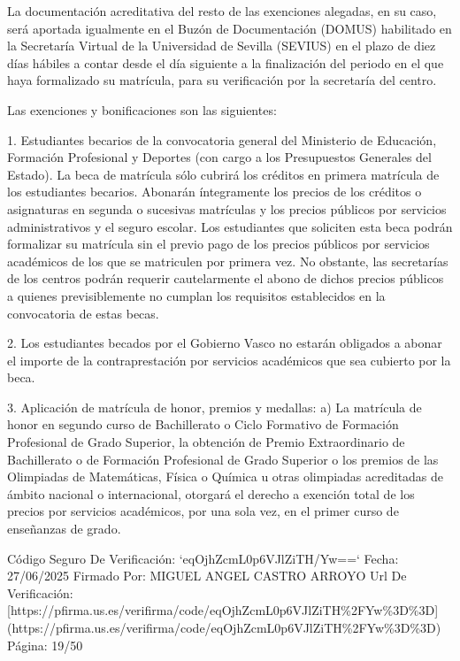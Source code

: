\documentclass{article}
\begin{document}
\begin{itemize}
\begin{itemize}
\begin{scriptsize}
                  La documentación acreditativa del resto de las exenciones alegadas, en su caso, será aportada igualmente en el Buzón de Documentación (DOMUS) habilitado en la Secretaría Virtual de la Universidad de Sevilla (SEVIUS) en el plazo de diez días hábiles a contar desde el día siguiente a la finalización del periodo en el que haya formalizado su matrícula, para su verificación por la secretaría del centro.

                  Las exenciones y bonificaciones son las siguientes:

                  1. Estudiantes becarios de la convocatoria general del Ministerio de Educación, Formación Profesional y Deportes (con cargo a los Presupuestos Generales del Estado). La beca de matrícula sólo cubrirá los créditos en primera matrícula de los estudiantes becarios. Abonarán íntegramente los precios de los créditos o asignaturas en segunda o sucesivas matrículas y los precios públicos por servicios administrativos y el seguro escolar. Los estudiantes que soliciten esta beca podrán formalizar su matrícula sin el previo pago de los precios públicos por servicios académicos de los que se matriculen por primera vez. No obstante, las secretarías de los centros podrán requerir cautelarmente el abono de dichos precios públicos a quienes previsiblemente no cumplan los requisitos establecidos en la convocatoria de estas becas.

                  2. Los estudiantes becados por el Gobierno Vasco no estarán obligados a abonar el importe de la contraprestación por servicios académicos que sea cubierto por la beca.

                  3. Aplicación de matrícula de honor, premios y medallas:
                  a) La matrícula de honor en segundo curso de Bachillerato o Ciclo Formativo de Formación Profesional de Grado Superior, la obtención de Premio Extraordinario de Bachillerato o de Formación Profesional de Grado Superior o los premios de las Olimpiadas de Matemáticas, Física o Química u otras olimpiadas acreditadas de ámbito nacional o internacional, otorgará el derecho a exención total de los precios por servicios académicos, por una sola vez, en el primer curso de enseñanzas de grado.

                  Código Seguro De Verificación: `eqOjhZcmL0p6VJlZiTH/Yw==`
                  Fecha: 27/06/2025
                  Firmado Por: MIGUEL ANGEL CASTRO ARROYO
                  Url De Verificación: [https://pfirma.us.es/verifirma/code/eqOjhZcmL0p6VJlZiTH\%2FYw\%3D\%3D](https://pfirma.us.es/verifirma/code/eqOjhZcmL0p6VJlZiTH\%2FYw\%3D\%3D)
                  Página: 19/50


\end{scriptsize}
\end{itemize}
\end{itemize}
\end{document}
